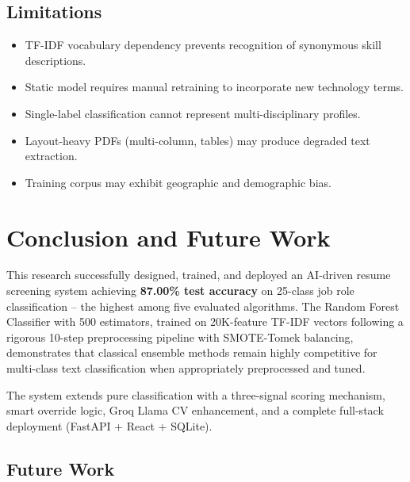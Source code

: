 \documentclass[10pt,twocolumn]{article}
\begin{document}
\subsection{Limitations}

\begin{itemize}
  \item TF-IDF vocabulary dependency prevents recognition of synonymous skill descriptions.
  \item Static model requires manual retraining to incorporate new technology terms.
  \item Single-label classification cannot represent multi-disciplinary profiles.
  \item Layout-heavy PDFs (multi-column, tables) may produce degraded text extraction.
  \item Training corpus may exhibit geographic and demographic bias.
\end{itemize}

\section{Conclusion and Future Work}

This research successfully designed, trained, and deployed an AI-driven resume screening system achieving \textbf{87.00\% test accuracy} on 25-class job role classification -- the highest among five evaluated algorithms. The Random Forest Classifier with 500 estimators, trained on 20K-feature TF-IDF vectors following a rigorous 10-step preprocessing pipeline with SMOTE-Tomek balancing, demonstrates that classical ensemble methods remain highly competitive for multi-class text classification when appropriately preprocessed and tuned.

The system extends pure classification with a three-signal scoring mechanism, smart override logic, Groq Llama CV enhancement, and a complete full-stack deployment (FastAPI + React + SQLite).

\subsection{Future Work}
\end{document}
